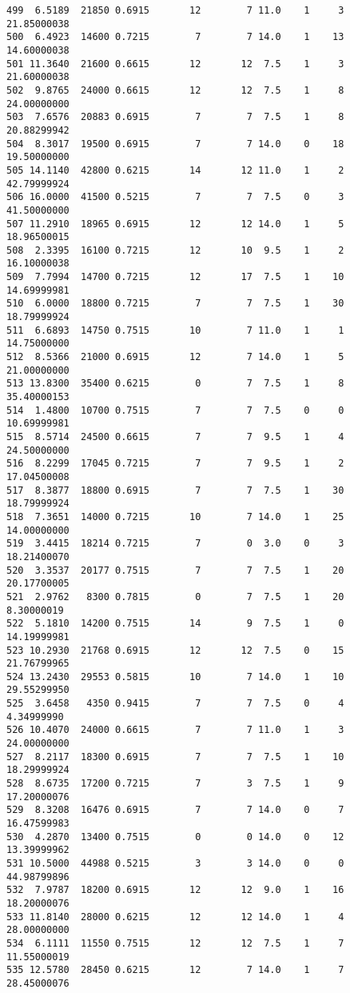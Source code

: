 \documentclass[
  letterpaper,
  DIV=11,
  numbers=noendperiod]{scrreprt}
\begin{document}
\begin{verbatim}
499  6.5189  21850 0.6915       12        7 11.0    1     3 21.85000038
500  6.4923  14600 0.7215        7        7 14.0    1    13 14.60000038
501 11.3640  21600 0.6615       12       12  7.5    1     3 21.60000038
502  9.8765  24000 0.6615       12       12  7.5    1     8 24.00000000
503  7.6576  20883 0.6915        7        7  7.5    1     8 20.88299942
504  8.3017  19500 0.6915        7        7 14.0    0    18 19.50000000
505 14.1140  42800 0.6215       14       12 11.0    1     2 42.79999924
506 16.0000  41500 0.5215        7        7  7.5    0     3 41.50000000
507 11.2910  18965 0.6915       12       12 14.0    1     5 18.96500015
508  2.3395  16100 0.7215       12       10  9.5    1     2 16.10000038
509  7.7994  14700 0.7215       12       17  7.5    1    10 14.69999981
510  6.0000  18800 0.7215        7        7  7.5    1    30 18.79999924
511  6.6893  14750 0.7515       10        7 11.0    1     1 14.75000000
512  8.5366  21000 0.6915       12        7 14.0    1     5 21.00000000
513 13.8300  35400 0.6215        0        7  7.5    1     8 35.40000153
514  1.4800  10700 0.7515        7        7  7.5    0     0 10.69999981
515  8.5714  24500 0.6615        7        7  9.5    1     4 24.50000000
516  8.2299  17045 0.7215        7        7  9.5    1     2 17.04500008
517  8.3877  18800 0.6915        7        7  7.5    1    30 18.79999924
518  7.3651  14000 0.7215       10        7 14.0    1    25 14.00000000
519  3.4415  18214 0.7215        7        0  3.0    0     3 18.21400070
520  3.3537  20177 0.7515        7        7  7.5    1    20 20.17700005
521  2.9762   8300 0.7815        0        7  7.5    1    20  8.30000019
522  5.1810  14200 0.7515       14        9  7.5    1     0 14.19999981
523 10.2930  21768 0.6915       12       12  7.5    0    15 21.76799965
524 13.2430  29553 0.5815       10        7 14.0    1    10 29.55299950
525  3.6458   4350 0.9415        7        7  7.5    0     4  4.34999990
526 10.4070  24000 0.6615        7        7 11.0    1     3 24.00000000
527  8.2117  18300 0.6915        7        7  7.5    1    10 18.29999924
528  8.6735  17200 0.7215        7        3  7.5    1     9 17.20000076
529  8.3208  16476 0.6915        7        7 14.0    0     7 16.47599983
530  4.2870  13400 0.7515        0        0 14.0    0    12 13.39999962
531 10.5000  44988 0.5215        3        3 14.0    0     0 44.98799896
532  7.9787  18200 0.6915       12       12  9.0    1    16 18.20000076
533 11.8140  28000 0.6215       12       12 14.0    1     4 28.00000000
534  6.1111  11550 0.7515       12       12  7.5    1     7 11.55000019
535 12.5780  28450 0.6215       12        7 14.0    1     7 28.45000076

\end{verbatim}
\end{document}
